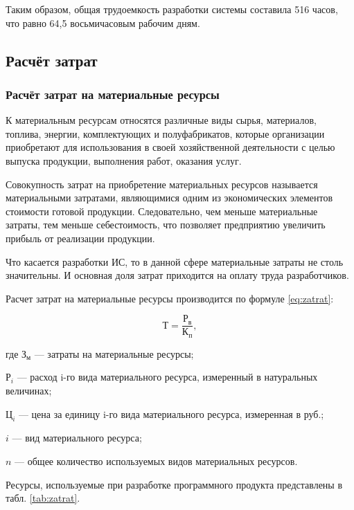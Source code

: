Таким образом, общая трудоемкость разработки системы составила 516 часов, что равно 64,5 восьмичасовым рабочим дням.

\subsection{Расчёт затрат}

\subsubsection{Расчёт затрат на материальные ресурсы}

К материальным ресурсам относятся различные виды сырья, материалов, топлива, энергии, комплектующих и полуфабрикатов, которые организации приобретают для использования в своей хозяйственной деятельности с целью выпуска продукции, выполнения работ, оказания услуг.

Совокупность затрат на приобретение материальных ресурсов называется материальными затратами, являющимися одним из экономических элементов стоимости готовой продукции.
Следовательно, чем меньше материальные затраты, тем меньше себестоимость, что позволяет предприятию увеличить прибыль от реализации продукции.

Что касается разработки ИС, то в данной сфере материальные затраты не столь значительны.
И основная доля затрат приходится на оплату труда разработчиков.

Расчет затрат на материальные ресурсы производится по формуле \ref{eq:zatrat}:

\begin{equation}
	\label{eq:zatrat}
	Т = \frac{Р_{в}}{К_{п}},
\end{equation}
\begin{ESKDexplanation}
	\item где $З_{м}$ --- затраты на материальные ресурсы;
	\item $Р_{i}$ --- расход i-го вида материального ресурса, измеренный в натуральных величинах;
	\item $Ц_{i}$ ---  цена за единицу i-го вида материального ресурса, измеренная в руб.;
	\item $i$ --- вид материального ресурса;
	\item $n$ --- общее количество используемых видов материальных ресурсов.
\end{ESKDexplanation}

Ресурсы, используемые при разработке программного продукта представлены в табл. \ref{tab:zatrat}. 

